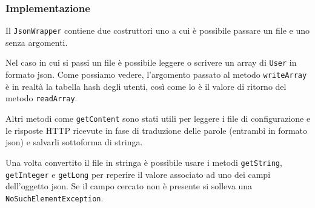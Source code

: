 \subsubsection{Implementazione}
Il \verb|JsonWrapper| contiene due costruttori uno a cui è possibile passare un file e uno senza
argomenti.

Nel caso in cui si passi un file è possibile leggere o scrivere un array di \verb|User| in formato
json. Come possiamo vedere, l'argomento passato al metodo \verb|writeArray| è in realtà la tabella
hash degli utenti, così come lo è il valore di ritorno del metodo \verb|readArray|.

Altri metodi come \verb|getContent| sono stati utili per leggere i file di configurazione e le
risposte HTTP ricevute in fase di traduzione delle parole (entrambi in formato json) e salvarli
sottoforma di stringa.

Una volta convertito il file in stringa è possibile usare i metodi \verb|getString|,
\verb|getInteger| e \verb|getLong| per reperire il valore associato ad uno dei campi dell'oggetto
json. Se il campo cercato non è presente si solleva una \verb|NoSuchElementException|.